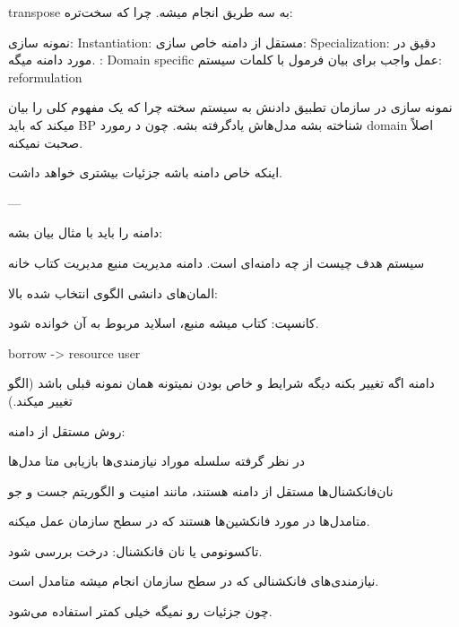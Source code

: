 
transpose به سه طریق انجام میشه. چرا که سخت‌تره:

نمونه سازی: Instantiation: مستقل از دامنه
خاص سازی: Specialization: دقیق در مورد دامنه میگه. : Domain specific
عمل واجب برای بیان فرمول با کلمات سیستم: reformulation

نمونه سازی در سازمان تطبیق دادنش به سیستم سخته چرا که یک مفهوم کلی را بیان میکند
که باید BP شناخته بشه مدل‌هاش یادگرفته بشه. چون د رمورد domain اصلاً صحبت
نمیکنه.

اینکه خاص دامنه باشه جزئیات بیشتری خواهد داشت.

---
 
دامنه را باید با مثال بیان بشه:

سیستم هدف چیست از چه دامنه‌ای است. دامنه مدیریت منبع
مدیریت کتاب خانه

المان‌های دانشی الگوی انتخاب شده بالا:

کانسپت: کتاب میشه منبع، 
اسلاید مربوط به آن خوانده شود.

borrow -> resource user

دامنه اگه تغییر بکنه دیگه شرایط و خاص بودن نمیتونه همان نمونه قبلی باشد (الگو
تغییر میکند.)

روش مستقل از دامنه:

در نظر گرفته سلسله موراد نیازمندی‌ها
بازیابی متا مدل‌ها

نان‌فانکشنال‌ها مستقل از دامنه هستند، مانند امنیت و الگوریتم جست و جو

متامدل‌ها در مورد فانکشین‌ها هستند که در سطح سازمان عمل میکنه.

تاکسونومی یا نان فانکشنال:
درخت بررسی شود.

نیازمندی‌های فانکشنالی که در سطح سازمان انجام میشه متامدل است.

چون جزئیات رو نمیگه خیلی کمتر استفاده می‌شود.
